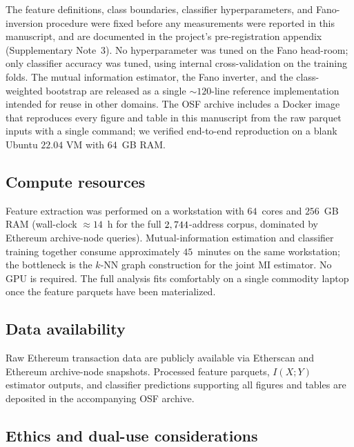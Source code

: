 \documentclass[11pt,a4paper]{article}
\begin{document}
The feature definitions, class boundaries, classifier hyperparameters,
and Fano-inversion procedure were fixed before any measurements were
reported in this manuscript, and are documented in the project's
pre-registration appendix (Supplementary Note~3). No hyperparameter was
tuned on the Fano head-room; only classifier accuracy was tuned, using
internal cross-validation on the training folds. The mutual information
estimator, the Fano inverter, and the class-weighted bootstrap are
released as a single $\sim$$120$-line reference implementation intended
for reuse in other domains. The OSF archive includes a Docker image that
reproduces every figure and table in this manuscript from the raw
parquet inputs with a single command; we verified end-to-end
reproduction on a blank Ubuntu $22.04$ VM with $64$~GB RAM.

\subsection*{Compute resources}

Feature extraction was performed on a workstation with $64$~cores and
$256$~GB RAM (wall-clock $\approx 14$~h for the full $2,744$-address
corpus, dominated by Ethereum archive-node queries). Mutual-information
estimation and classifier training together consume approximately
$45$~minutes on the same workstation; the bottleneck is the $k$-NN
graph construction for the joint MI estimator. No GPU is required. The
full analysis fits comfortably on a single commodity laptop once the
feature parquets have been materialized.

\subsection*{Data availability}

Raw Ethereum transaction data are publicly available via Etherscan and
Ethereum archive-node snapshots. Processed feature parquets,
$I(X;Y)$ estimator outputs, and classifier predictions supporting all
figures and tables are deposited in the accompanying OSF archive.

\subsection*{Ethics and dual-use considerations}
\end{document}
